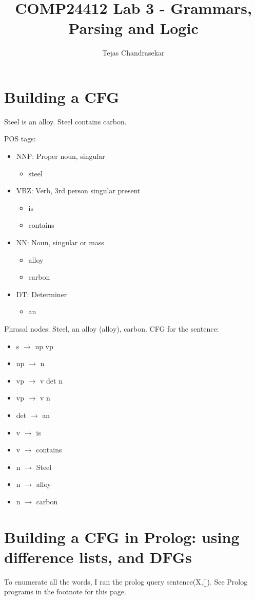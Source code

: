 \documentclass[12pt]{report}
\title{COMP24412 Lab 3 - Grammars, Parsing and Logic}
\author{Tejas Chandrasekar}
\begin{document}
\maketitle
\newpage

\section{Building a CFG}
Steel is an alloy. Steel contains carbon.\par
\noindent POS tags:
\begin{itemize}
  \item NNP: Proper noun, singular
  \begin{itemize}
    \item steel
  \end{itemize}
  \item VBZ: Verb, 3rd person singular present
  \begin{itemize}
    \item is
    \item contains
  \end{itemize}
  \item NN: Noun, singular or mass
  \begin{itemize}
    \item alloy
    \item carbon
  \end{itemize}
  \item DT: Determiner
  \begin{itemize}
    \item an
  \end{itemize}
\end{itemize}
Phrasal nodes: Steel, an alloy (alloy), carbon.
CFG for the sentence:
\begin{itemize}
  \item s $\rightarrow$ np vp
  \item np $\rightarrow$ n
  \item vp $\rightarrow$ v det n
  \item vp $\rightarrow$ v n
  \item det $\rightarrow$ an
  \item v $\rightarrow$ is
  \item v $\rightarrow$ contains
  \item n $\rightarrow$ Steel
  \item n $\rightarrow$ alloy
  \item n $\rightarrow$ carbon
\end{itemize}

\section{Building a CFG in Prolog: using difference lists, and DFGs}
To enumerate all the words, I ran the prolog query sentence(X,[]).
See Prolog programs in the footnote for this page.
\end{document}
